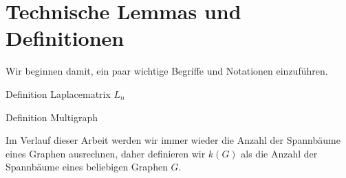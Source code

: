 \graphicspath{{grafiken/}}

\section{Technische Lemmas und Definitionen}
Wir beginnen damit, ein paar wichtige Begriffe und Notationen einzuführen.
\begin{Df}
Definition Laplacematrix $L_n$
\end{Df}

\begin{Dfs}
 Definition Multigraph
\end{Dfs}
Im Verlauf dieser Arbeit werden wir immer wieder die Anzahl der Spannbäume eines Graphen ausrechnen, daher definieren wir $\mathit{k}(G)$ als die Anzahl der Spannbäume eines beliebigen Graphen $G$.
